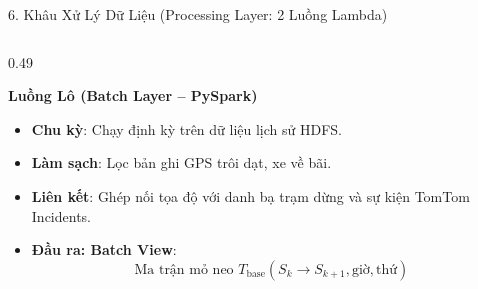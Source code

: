 \documentclass[aspectratio=169,10pt]{beamer}
\begin{document}
\begin{frame}{6. Khâu Xử Lý Dữ Liệu (Processing Layer: 2 Luồng Lambda)}
\begin{columns}[T]
    \begin{column}{0.49\textwidth}
        \begin{block}{\textbf{Luồng Lô (Batch Layer -- PySpark)}}
            \begin{itemize}\setlength{\itemsep}{2pt}\footnotesize
                \item \textbf{Chu kỳ}: Chạy định kỳ trên dữ liệu lịch sử HDFS.
                \item \textbf{Làm sạch}: Lọc bản ghi GPS trôi dạt, xe về bãi.
                \item \textbf{Liên kết}: Ghép nối tọa độ với danh bạ trạm dừng và sự kiện TomTom Incidents.
                \item \textbf{Đầu ra: Batch View}:
                $$\text{Ma trận mỏ neo } T_{\text{base}}(S_k \to S_{k+1}, \text{giờ}, \text{thứ})$$
            \end{itemize}
        \end{block}
        \vspace{2pt}
        \centering
    \end{column}


\end{columns}
\end{frame}
\end{document}
